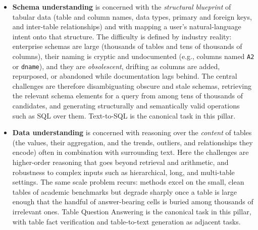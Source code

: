 \begin{itemize}
    \item \textbf{Schema understanding} is concerned with the \emph{structural blueprint} of tabular data (table and column names, data types, primary and foreign keys, and inter-table relationships) and with mapping a user's natural-language intent onto that structure. The difficulty is defined by industry reality: enterprise schemas are large (thousands of tables and tens of thousands of columns), their naming is cryptic and undocumented (e.g., columns named \texttt{A2} or \texttt{dname}), and they are \emph{obsolescent}, drifting as columns are added, repurposed, or abandoned while documentation lags behind. The central challenges are therefore disambiguating obscure and stale schemas, retrieving the relevant schema elements for a query from among tens of thousands of candidates, and generating structurally and semantically valid operations such as SQL over them. Text-to-SQL is the canonical task in this pillar.

    \item \textbf{Data understanding} is concerned with reasoning over the \emph{content} of tables (the values, their aggregation, and the trends, outliers, and relationships they encode) often in combination with surrounding text. Here the challenges are higher-order reasoning that goes beyond retrieval and arithmetic, and robustness to complex inputs such as hierarchical, long, and multi-table settings. The same scale problem recurs: methods excel on the small, clean tables of academic benchmarks but degrade sharply once a table is large enough that the handful of answer-bearing cells is buried among thousands of irrelevant ones. Table Question Answering is the canonical task in this pillar, with table fact verification and table-to-text generation as adjacent tasks.
\end{itemize}

